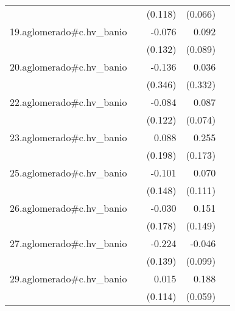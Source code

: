 {\begin{longtable}{l*{4}{D{.}{.}{-1}}}
            &                     &     (0.118)         &     (0.066)         &                     \\
\addlinespace
19.aglomerado#c.hv\_banio&                     &      -0.076         &       0.092         &                     \\
            &                     &     (0.132)         &     (0.089)         &                     \\
\addlinespace
20.aglomerado#c.hv\_banio&                     &      -0.136         &       0.036         &                     \\
            &                     &     (0.346)         &     (0.332)         &                     \\
\addlinespace
22.aglomerado#c.hv\_banio&                     &      -0.084         &       0.087         &                     \\
            &                     &     (0.122)         &     (0.074)         &                     \\
\addlinespace
23.aglomerado#c.hv\_banio&                     &       0.088         &       0.255         &                     \\
            &                     &     (0.198)         &     (0.173)         &                     \\
\addlinespace
25.aglomerado#c.hv\_banio&                     &      -0.101         &       0.070         &                     \\
            &                     &     (0.148)         &     (0.111)         &                     \\
\addlinespace
26.aglomerado#c.hv\_banio&                     &      -0.030         &       0.151         &                     \\
            &                     &     (0.178)         &     (0.149)         &                     \\
\addlinespace
27.aglomerado#c.hv\_banio&                     &      -0.224         &      -0.046         &                     \\
            &                     &     (0.139)         &     (0.099)         &                     \\
\addlinespace
29.aglomerado#c.hv\_banio&                     &       0.015         &       0.188\sym{**} &                     \\
            &                     &     (0.114)         &     (0.059)         &                     \\

\end{longtable}}
